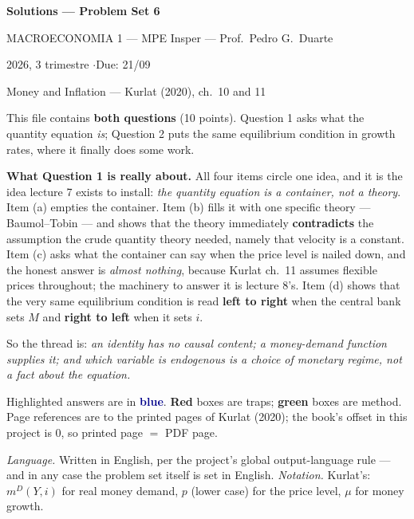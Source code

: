 \documentclass[11pt, a4paper]{article}
\newcommand{\resp}[1]{%
  \ifmmode {\color{darkblue}#1}\else\textcolor{darkblue}{\textbf{#1}}\fi}
\newcommand{\md}{m^{D}}
\begin{document}
\begin{center}
{\LARGE\bfseries\color{darkblue} Solutions --- Problem Set 6\par}
\vspace{4pt}
{\large MACROECONOMIA 1 --- MPE Insper --- Prof.\ Pedro G.\ Duarte\par}
\vspace{2pt}
{\normalsize 2026, 3\textordmasculine{} trimestre \quad$\cdot$\quad Due: 21/09\par}
\vspace{2pt}
{\small Money and Inflation --- Kurlat (2020), ch.\ 10 and 11\par}
\end{center}
\vspace{6pt}

\begin{tcolorbox}[theorybox, title={How to read this document}]
\small
This file contains \textbf{both questions} (10 points). Question 1 asks what the quantity
equation \emph{is}; Question 2 puts the same equilibrium condition in growth rates, where it
finally does some work.

\smallskip
\textbf{What Question 1 is really about.} All four items circle one idea, and it is the idea
lecture 7 exists to install: \emph{the quantity equation is a container, not a theory}. Item
(a) empties the container. Item (b) fills it with one specific theory --- Baumol--Tobin ---
and shows that the theory immediately \textbf{contradicts} the assumption the crude quantity
theory needed, namely that velocity is a constant. Item (c) asks what the container can say
when the price level is nailed down, and the honest answer is \emph{almost nothing}, because
Kurlat ch.\ 11 assumes flexible prices throughout; the machinery to answer it is lecture 8's.
Item (d) shows that the very same equilibrium condition is read \textbf{left to right} when
the central bank sets $M$ and \textbf{right to left} when it sets $i$.

\smallskip
So the thread is: \emph{an identity has no causal content; a money-demand function supplies
it; and which variable is endogenous is a choice of monetary regime, not a fact about the
equation.}

\smallskip
Highlighted answers are in \resp{blue}. \textcolor{trapcolor}{\textbf{Red}} boxes are traps;
\textcolor{plancolor}{\textbf{green}} boxes are method. Page references are to the printed
pages of Kurlat (2020); the book's offset in this project is $0$, so printed page $=$ PDF
page.

\smallskip
\emph{Language.} Written in English, per the project's global output-language rule --- and in
any case the problem set itself is set in English. \emph{Notation.} Kurlat's: $\md(Y,i)$ for
real money demand, $p$ (lower case) for the price level, $\mu$ for money growth.
\end{tcolorbox}
\end{document}
